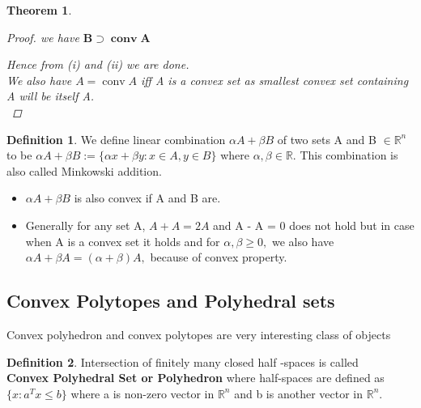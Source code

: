 \documentclass[oneside]{book}
\newtheorem{theorem}{Theorem}[section]
\theoremstyle{definition}
\newtheorem{mydef}{Definition}[chapter]
\begin{document}
\begin{theorem}
\begin{proof}
we have  $ \mathbf{B} \supset \mathbf{\operatorname{conv} A}  $ \par
 Hence from (i) and (ii) we are done. \\
 We also have $A = \operatorname{conv} A$ iff A is a convex set as smallest convex set containing A will be itself A. \\

 \end{proof}
 
\end{theorem}

\begin{mydef}
We define linear combination $\alpha A+\beta B$ of two sets A and B $\in \mathbb{R}^n$ to be 
$\alpha A+\beta B:=\{\alpha x+\beta y: x \in A, y \in B\}$ where $\alpha,\beta \in \mathbb{R}$.
This combination is also called Minkowski addition.


\begin{itemize}
    \item $\alpha A+\beta B $ is also convex if A and B are. 
\item
Generally for any set A, $A +A = 2A $ and A - A = 0  does not hold but in case when A is a convex set it holds and 
 for $\alpha, \beta \geq 0,$ we also have $\alpha A+\beta A=(\alpha+\beta) A,$ because of convex property. \end{itemize}
 \end{mydef}
 
 
 
 

 
 
 
 
 
 
 
 
 
 
 
 
 
 
 
 
 
 
 
 
 
 
 
 
 
 
 
\subsection{ Convex Polytopes and Polyhedral sets }
Convex polyhedron and convex polytopes are very interesting class of objects 
\begin{mydef}

Intersection of finitely many closed half -spaces  is called \\
\textbf{ Convex Polyhedral Set  or Polyhedron}
 where half-spaces are defined as $\{ x : a^{T}x \leq b\} $  where a is non-zero vector in $\mathbb{R}^n$ and b is another vector in  $\mathbb{R}^n.$  
 
 
\end{mydef}
\end{document}
